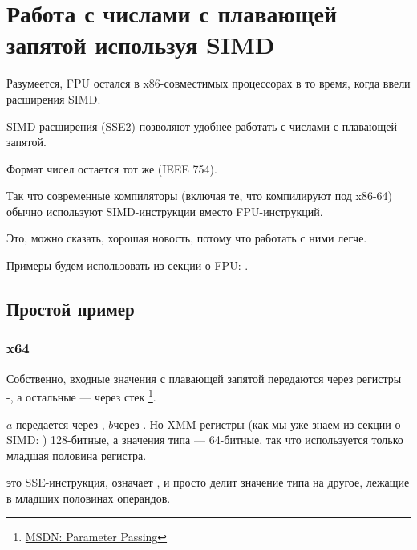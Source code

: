 \section{Работа с числами с плавающей запятой используя SIMD}

\label{floating_SIMD}
Разумеется, FPU остался в x86-совместимых процессорах в то время, когда ввели расширения \ac{SIMD}.

\ac{SIMD}-расширения (SSE2) позволяют удобнее работать с числами с плавающей запятой.

Формат чисел остается тот же (IEEE 754).

Так что современные компиляторы (включая те, что компилируют под x86-64) 
обычно используют \ac{SIMD}-инструкции вместо FPU-инструкций.

Это, можно сказать, хорошая новость, потому что работать с ними легче.

Примеры будем использовать из секции о FPU: .

\subsection{Простой пример}



\subsubsection{x64}



Собственно, входные значения с плавающей запятой передаются через регистры -, 
а остальные --- через стек
\footnote{\href{http://go.yurichev.com/17263}{MSDN: Parameter Passing}}.

$a$ передается через , $b$\EMDASH{}через .
Но XMM-регистры (как мы уже знаем из секции о \ac{SIMD}: ) 128-битные, 
а значения типа \Tdouble --- 64-битные,
так что используется только младшая половина регистра.

 это SSE-инструкция, означает 
, 
и просто делит значение типа \Tdouble на другое, лежащие в младших половинах операндов.

